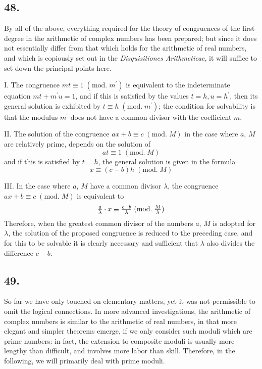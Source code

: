 \documentclass[twoside,12pt]{memoir}
\renewcommand{\pmod}[1]{\;(\textrm{mod.}\;#1)}
\let\oldfrac\frac
\def\frac#1#2{\mathchoice{\tfrac{#1}{#2}}{\oldfrac{#1}{#2}}{\genfrac{}{}{}{2}{#1}{#2\mathstrut}}{\genfrac{}{}{}{3}{#1}{#2\mathstrut}}}
\begin{document}
%

\subsection*{48.}

By all of the above, everything required for the theory of congruences of the first degree in the arithmetic of complex numbers has been prepared; but since it does not essentially differ from that which holds for the arithmetic of real numbers, and which is copiously set out in the \textit{Disquisitiones Arithmeticae}, it will suffice to set down the principal points here.

I. The congruence \(m t \equiv 1\pmod{m^{\prime}}\) is equivalent to the indeterminate equation \(m t+m^{\prime} u=1\), and if this is satisfied by the values \(t=h, u=h^{\prime}\), then its general solution is exhibited by \(t \equiv h\pmod{m^{\prime}}\); the condition for solvability is that the modulus \(m^{\prime}\) does not have a common divisor with the coefficient \(m\).

II. The solution of the congruence \(a x+b \equiv c\pmod{M}\) in the case where \(a\), \(M\) are relatively prime, depends on the solution of
\[a t \equiv 1\pmod{M}\]
and if this is satisfied by \(t=h\), the general solution is given in the formula
\[x \equiv(c-b) h\pmod{M}\]

III. In the case where \(a\), \(M\) have a common divisor \(\lambda\), the congruence \(a x+b \equiv c\pmod{M}\) is equivalent to
\[\frac{a}{\lambda} \cdot x \equiv \frac{c-b}{\lambda}\pmod{\frac{M}{\lambda}}\]
Therefore, when the greatest common divisor of the numbers \(a\), \(M\) is adopted for \(\lambda\), the solution of the proposed congruence is reduced to the preceding case, and for this to be solvable it is clearly necessary and sufficient that \(\lambda\) also divides the difference \(c-b\).
%

\subsection*{49.}

So far we have only touched on elementary matters, yet it was not permissible to omit the logical connections. In more advanced investigations, the arithmetic of complex numbers is similar to the arithmetic of real numbers, in that more elegant and simpler theorems emerge, if we only consider such moduli which are prime numbers: in fact, the extension to composite moduli is usually more lengthy than difficult, and involves more labor than skill. Therefore, in the following, we will primarily deal with prime moduli.
%
\end{document}
